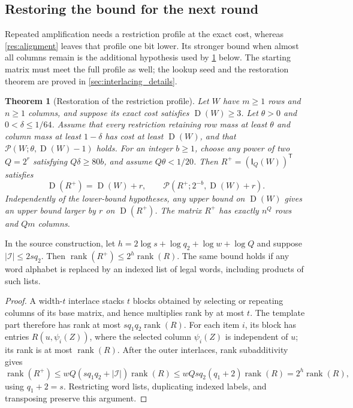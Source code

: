 \documentclass[11pt]{article} \usepackage[utf8]{inputenc}
\theoremstyle{plain} \newtheorem{theorem}{Theorem}[section]
\theoremstyle{definition} \newaliascnt{definition}{theorem}
\newcommand{\D}{\operatorname{D}}
\newcommand{\Int}[2]{\mathsf{I}_{#1}(#2)}
\newcommand{\RP}[3]{\mathcal{P}(#1;#2,#3)}
\DeclareMathOperator{\rank}{rank} \crefname{claim}{Claim}{Claims}
\begin{document}
\subsection{Restoring the bound for the next round}

Repeated amplification needs a restriction profile at the exact cost, whereas
\cref{res:alignment} leaves that profile one bit lower. Its stronger bound when
almost all columns remain is the additional hypothesis used by \cref{cl:bridge}
below. The starting matrix must meet the full profile as well; the lookup seed
and the restoration theorem are proved in \cref{sec:interlacing_details}.

\begin{theorem}[Restoration of the restriction profile]\label{cl:bridge}
Let $W$ have $m\ge1$ rows and $n\ge1$ columns, and suppose its exact cost
satisfies $\D(W)\ge3$. Let $\theta>0$ and $0<\delta\le1/64$. Assume that every
restriction retaining row mass at least $\theta$ and column mass at least
$1-\delta$ has cost at least $\D(W)$, and that $\RP{W}{\theta}{\D(W)-1}$ holds.
For an integer $b\ge1$, choose any power of two $Q=2^r$ satisfying
$Q\delta\ge80b$, and assume $Q\theta<1/20$. Then $R^+=(\Int{Q}{W})^{\mathsf T}$
satisfies
\[
\D(R^+)=\D(W)+r,\qquad \RP{R^+}{2^{-b}}{\D(W)+r}.
\]
Independently of the lower-bound hypotheses, any upper bound on $\D(W)$ gives an
upper bound larger by $r$ on $\D(R^+)$. The matrix $R^+$ has exactly $n^Q$ rows
and $Qm$ columns.
\end{theorem}

\begin{lemma}\label{lem:amplifier-rank}
In the source construction, let
$h=2\log s+\log q_2+\log w+\log Q$ and suppose
$|\mathcal I|\le2sq_2$. Then $\rank(R^+)\le2^h\rank(R)$.
The same bound holds if any word alphabet is replaced by an indexed list
of legal words, including products of such lists.
\end{lemma}
\begin{proof}
A width-$t$ interlace stacks $t$ blocks obtained by selecting or repeating
columns of its base matrix, and hence multiplies rank by at most $t$.
The template part therefore has rank at most $sq_1q_2\rank(R)$.
For each item $i$, its block has entries $R(u,\psi_i(Z))$, where the selected
column $\psi_i(Z)$ is independent of $u$; its rank is at most $\rank(R)$.
After the outer interlaces, rank subadditivity gives
\[
\rank(R^+)\le wQ(sq_1q_2+|\mathcal I|)\rank(R)
\le wQsq_2(q_1+2)\rank(R)=2^h\rank(R),
\]
using $q_1+2=s$. Restricting word lists, duplicating indexed labels, and
transposing preserve this argument.
\end{proof}
\end{document}
